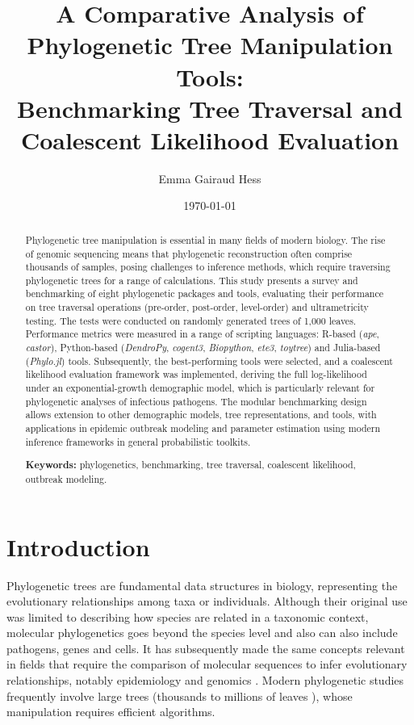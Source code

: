 \documentclass[11pt, a4paper]{article}
\title{A Comparative Analysis of Phylogenetic Tree Manipulation Tools: \\
Benchmarking Tree Traversal and Coalescent Likelihood Evaluation}
\author{Emma Gairaud Hess}
\date{\today}
\newcommand{\ape}{\textit{ape}}
\newcommand{\dendropy}{\textit{DendroPy}}
\newcommand{\cogent}{\textit{cogent3}}
\newcommand{\biopython}{\textit{Biopython}}
\newcommand{\ete}{\textit{ete3}}
\newcommand{\toytree}{\textit{toytree}}
\newcommand{\phylo}{\textit{Phylo.jl}}
\newcommand{\castor}{\textit{castor}}
\begin{document}
\maketitle

\begin{abstract}

Phylogenetic tree manipulation is essential in many fields of modern biology. The rise of genomic sequencing means that phylogenetic reconstruction often comprise thousands of samples, posing challenges to inference methods, which require traversing phylogenetic trees for a range of calculations. This study presents a survey and benchmarking of eight phylogenetic packages and tools,
evaluating their performance on tree traversal operations (pre-order, post-order, level-order) and ultrametricity testing.
The tests were conducted on randomly generated trees of 1{,}000 leaves.
Performance metrics were measured in a range of scripting languages: R-based (\ape, \castor), Python-based
(\dendropy, \cogent, \biopython, \ete, \toytree) and Julia-based (\phylo) tools.
Subsequently, the best-performing tools were selected, and  a coalescent likelihood evaluation framework was implemented, deriving the full log-likelihood under an exponential-growth demographic model, which is particularly relevant for phylogenetic analyses of infectious pathogens.
The modular benchmarking design allows extension to other demographic models, tree representations, and tools, with applications in epidemic outbreak modeling and parameter estimation using modern inference frameworks in general probabilistic toolkits.

\vspace{0.3cm}
\noindent \textbf{Keywords:} phylogenetics, benchmarking, tree traversal, coalescent likelihood, outbreak modeling.

\end{abstract}

\newpage
\tableofcontents
\newpage

\section{Introduction}

Phylogenetic trees are fundamental data structures in biology, representing the evolutionary relationships among taxa or individuals. Although their original use was limited to describing how species are related in a taxonomic context, molecular phylogenetics goes beyond the species level and also can also include pathogens, genes and cells. It has subsequently made the same concepts relevant in fields that require the comparison of molecular sequences to infer evolutionary relationships, notably epidemiology and genomics \cite{yang2012molecular,whelan2001molecular}. 
Modern phylogenetic studies frequently involve large trees (thousands to millions of leaves \cite{ferreira2021covizu}), whose manipulation requires efficient algorithms.
\end{document}
